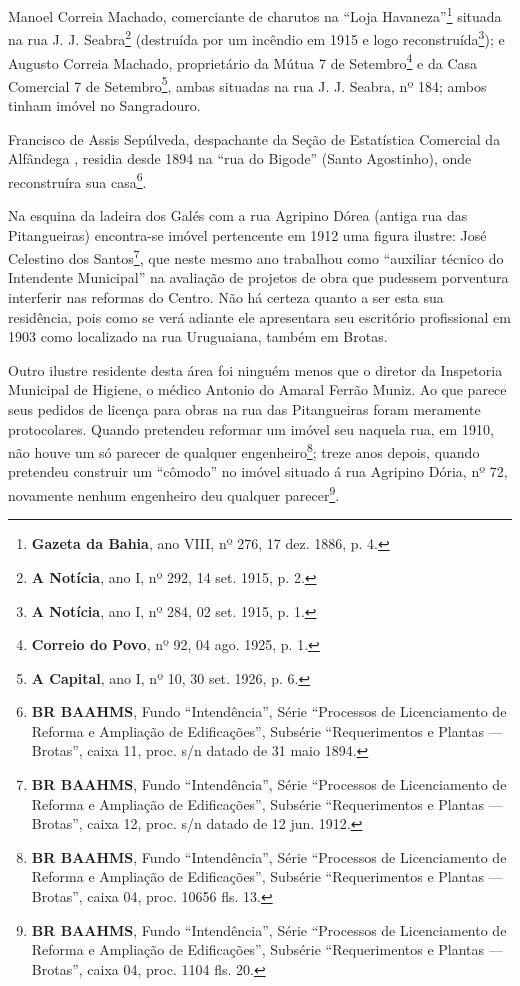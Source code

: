 Manoel Correia Machado, comerciante de charutos na ``Loja Havaneza''\footnote{\textbf{Gazeta da Bahia}, ano VIII, nº 276, 17 dez. 1886, p. 4.} situada na rua J. J. Seabra\footnote{\textbf{A Notícia}, ano I, nº 292, 14 set. 1915, p. 2.} (destruída por um incêndio em 1915 e logo reconstruída\footnote{\textbf{A Notícia}, ano I, nº 284, 02 set. 1915, p. 1.}); e Augusto Correia Machado, proprietário da Mútua 7 de Setembro\footnote{\textbf{Correio do Povo}, nº 92, 04 ago. 1925, p. 1.} e da Casa Comercial 7 de Setembro\footnote{\textbf{A Capital}, ano I, nº 10, 30 set. 1926, p. 6.}, ambas situadas na rua J. J. Seabra, nº 184; ambos tinham imóvel no Sangradouro. 

Francisco de Assis Sepúlveda, despachante da Seção de Estatística Comercial da Alfândega \cite[p.~306]{reis_almanak_1898}, residia desde 1894 na ``rua do Bigode'' (Santo Agostinho), onde reconstruíra sua casa\footnote{\textbf{BR BAAHMS}, Fundo ``Intendência'', Série ``Processos de Licenciamento de Reforma e Ampliação de Edificações'', Subsérie ``Requerimentos e Plantas --- Brotas'', caixa 11, proc. s/n datado de 31 maio 1894.}.

Na esquina da ladeira dos Galés com a rua Agripino Dórea (antiga rua das Pitangueiras) encontra-se imóvel pertencente em 1912 uma figura ilustre: José Celestino dos Santos\footnote{\textbf{BR BAAHMS}, Fundo ``Intendência'', Série ``Processos de Licenciamento de Reforma e Ampliação de Edificações'', Subsérie ``Requerimentos e Plantas --- Brotas'', caixa 12, proc. s/n datado de 12 jun. 1912.}, que neste mesmo ano trabalhou como ``auxiliar técnico do Intendente Municipal'' na avaliação de projetos de obra que pudessem porventura interferir nas reformas do Centro. Não há certeza quanto a ser esta sua residência, pois como se verá adiante ele apresentara seu escritório profissional em 1903 como localizado na rua Uruguaiana, também em Brotas.

Outro ilustre residente desta área foi ninguém menos que o diretor da Inspetoria Municipal de Higiene, o médico Antonio do Amaral Ferrão Muniz. Ao que parece seus pedidos de licença para obras na rua das Pitangueiras foram meramente protocolares. Quando pretendeu reformar um imóvel seu naquela rua, em 1910, não houve um só parecer de qualquer engenheiro\footnote{\textbf{BR BAAHMS}, Fundo ``Intendência'', Série ``Processos de Licenciamento de Reforma e Ampliação de Edificações'', Subsérie ``Requerimentos e Plantas --- Brotas'', caixa 04, proc. 10656 fls. 13.}; treze anos depois, quando pretendeu construir um ``cômodo'' no imóvel situado á rua Agripino Dória, nº 72, novamente nenhum engenheiro deu qualquer parecer\footnote{\textbf{BR BAAHMS}, Fundo ``Intendência'', Série ``Processos de Licenciamento de Reforma e Ampliação de Edificações'', Subsérie ``Requerimentos e Plantas --- Brotas'', caixa 04, proc. 1104 fls. 20.}.

